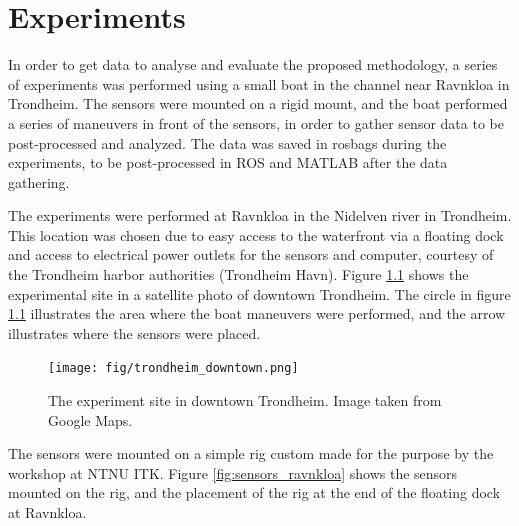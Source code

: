 
\chapter{Experiments}
In order to get data to analyse and evaluate the proposed methodology, a series of experiments was performed using a small boat in the channel near Ravnkloa in Trondheim. The sensors were mounted on a rigid mount, and the boat performed a series of maneuvers in front of the sensors, in order to gather sensor data to be post-processed and analyzed. The data was saved in rosbags during the experiments, to be post-processed in ROS and MATLAB after the data gathering.

The experiments were performed at Ravnkloa in the Nidelven river in Trondheim. This location was chosen due to easy access to the waterfront via a floating dock and access to electrical power outlets for the sensors and computer, courtesy of the Trondheim harbor authorities (Trondheim Havn). Figure \ref{fig:trondheim_sentrum} shows the experimental site in a satellite photo of downtown Trondheim. The circle in figure \ref{fig:trondheim_sentrum} illustrates the area where the boat maneuvers were performed, and the arrow illustrates where the sensors were placed.
\begin{figure}[H]
	\centering
	\texttt{[image: fig/trondheim\_downtown.png]}
	\caption{The experiment site in downtown Trondheim. Image taken from Google Maps.}
	\label{fig:trondheim_sentrum}
\end{figure}
The sensors were mounted on a simple rig custom made for the purpose by the workshop at NTNU ITK. Figure \ref{fig:sensors_ravnkloa} shows the sensors mounted on the rig, and the placement of the rig at the end of the floating dock at Ravnkloa.
